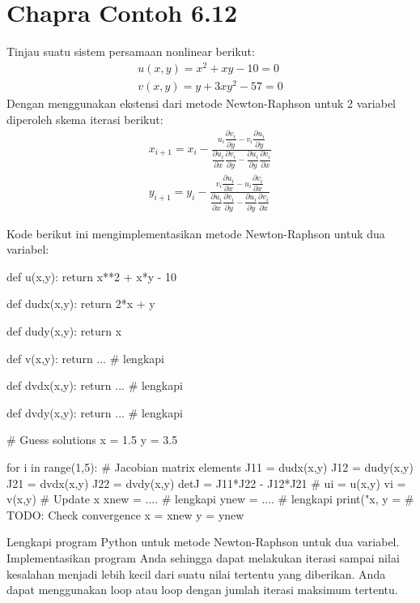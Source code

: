 \section{Chapra Contoh 6.12}
Tinjau suatu sistem persamaan nonlinear berikut:
\begin{align*}
u(x,y) = x^{2} + xy - 10 = 0 \\
v(x,y) = y + 3xy^{2} - 57 = 0
\end{align*}
Dengan menggunakan ekstensi dari metode Newton-Raphson untuk 2 variabel
diperoleh skema iterasi berikut:
\begin{align}
x_{i+1} = x_{i} - \frac{
u_{i}\dfrac{\partial v_{i}}{\partial y} - 
v_{i}\dfrac{\partial u_{i}}{\partial y}
}%
{\dfrac{\partial u_{i}}{\partial x}\dfrac{\partial v_{i}}{\partial y} -
 \dfrac{\partial u_{i}}{\partial y}\dfrac{\partial v_{i}}{\partial x} } \\
y_{i+1} = y_{i} - \frac{
v_{i}\dfrac{\partial u_{i}}{\partial x} - 
u_{i}\dfrac{\partial v_{i}}{\partial x}
}%
{\dfrac{\partial u_{i}}{\partial x}\dfrac{\partial v_{i}}{\partial y} -
 \dfrac{\partial u_{i}}{\partial y}\dfrac{\partial v_{i}}{\partial x} }
\end{align}

Kode berikut ini mengimplementasikan metode Newton-Raphson untuk dua variabel:
\begin{pythoncode}
def u(x,y):
    return x**2 + x*y - 10

def dudx(x,y):
    return 2*x + y

def dudy(x,y):
    return x

def v(x,y):
    return ... # lengkapi

def dvdx(x,y):
    return ... # lengkapi

def dvdy(x,y):
    return ... # lengkapi

# Guess solutions
x = 1.5
y = 3.5

for i in range(1,5):
    # Jacobian matrix elements
    J11 = dudx(x,y)
    J12 = dudy(x,y)
    J21 = dvdx(x,y)
    J22 = dvdy(x,y)
    detJ = J11*J22 - J12*J21
    #
    ui = u(x,y)
    vi = v(x,y)
    # Update x
    xnew = .... # lengkapi
    ynew = .... # lengkapi
    print("x, y = %
    # TODO: Check convergence
    x = xnew
    y = ynew
\end{pythoncode}

\begin{soal}
Lengkapi program Python untuk metode Newton-Raphson untuk dua variabel.
Implementasikan program Anda sehingga
dapat melakukan iterasi sampai nilai kesalahan menjadi lebih kecil dari
suatu nilai tertentu yang diberikan. Anda dapat menggunakan loop 
atau loop  dengan jumlah iterasi maksimum tertentu.
\end{soal}

